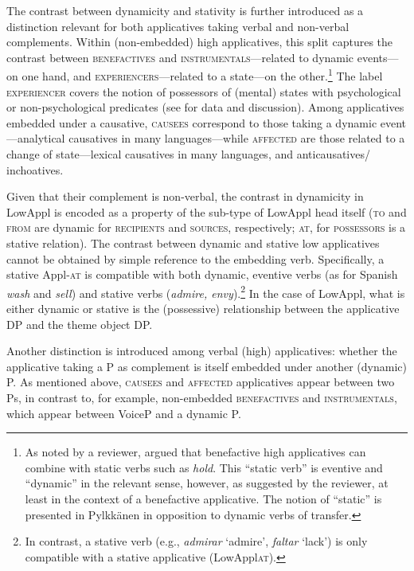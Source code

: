 \documentclass[output=paper,colorlinks,citecolor=brown,nonflat]{./langscibook}
\begin{document}
The contrast between dynamicity and stativity is further introduced as a distinction relevant for both applicatives taking verbal and non-verbal complements. Within (non-embedded) high applicatives, this split captures the contrast between \textsc{benefactives} and \textsc{instrumentals}—related to dynamic events—on one hand, and \textsc{experiencers}—related to a state—on the other.\footnote{As noted by a reviewer, \citet{Pylkkänen2008} argued that benefactive high applicatives can combine with static verbs such as \textit{hold}. This “static verb” is eventive and “dynamic” in the relevant sense, however, as suggested by the reviewer, at least in the context of a benefactive applicative. The notion of “static” is presented in Pylkkänen in opposition to dynamic verbs of transfer.} The label \textsc{experiencer} covers the notion of possessors of (mental) states with psychological or non-psychological predicates (see  for data and discussion). Among applicatives embedded under a causative, \textsc{causees} correspond to those taking a dynamic event—analytical causatives in many languages—while \textsc{affected} are those related to a change of state—lexical causatives in many languages, and anticausatives/ inchoatives. 

Given that their complement is non-verbal, the contrast in dynamicity in LowAppl is encoded as a property of the sub-type of LowAppl head itself (\textsc{to} and \textsc{from} are dynamic for \textsc{recipients} and \textsc{sources}, respectively; \textsc{at}, for \textsc{possessors} is a stative relation). The contrast between dynamic and stative low applicatives cannot be obtained by simple reference to the embedding verb. Specifically, a stative Appl-\textsc{at} is compatible with both dynamic, eventive verbs (as for Spanish \textit{wash} and \textit{sell}) and stative verbs (\textit{admire, envy}).\footnote{In contrast, a stative verb (e.g., \textit{admirar} ‘admire’, \textit{faltar} ‘lack’) is only compatible with a stative applicative (LowAppl\textsc{at}).}  In the case of LowAppl, what is either dynamic or stative is the (possessive) relationship between the applicative DP and the theme object DP. 

Another distinction is introduced among verbal (high) applicatives: whether the applicative taking a \liv P as complement is itself embedded under another (dynamic) \liv P. As mentioned above, \textsc{causees} and \textsc{affected} applicatives appear between two \liv Ps, in contrast to, for example, non-embedded \textsc{benefactives} and \textsc{instrumentals}, which appear between VoiceP and a dynamic \liv P. 
\end{document}
